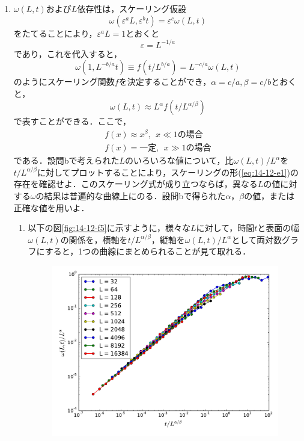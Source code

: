 \documentclass{jsarticle}
\begin{document}
\begin{enumerate}
        \item $\omega(L,t)$および$L$依存性は，スケーリング仮設
        \begin{equation}
            \omega(\varepsilon^{a}L, \varepsilon^{b}t) = \varepsilon^{c}\omega(L,t)
        \end{equation}
        をたてることにより，$\varepsilon^{a}L=1$とおくと
        \begin{equation}
            \varepsilon = L^{-1/a}
        \end{equation}
        であり，これを代入すると，
        \begin{equation}
            \omega(1, L^{-b/a}t) \equiv f(t/L^{b/a}) = L^{-c/a}\omega(L,t)
        \end{equation}
        のようにスケーリング関数$f$を決定することができ，$\alpha=c/a, \beta=c/b$とおくと，
        \begin{equation}
            \omega(L, t) \approx L^{\alpha}f(t/L^{\alpha/\beta})
            \label{eq:14-12-e1}
        \end{equation}
        で表すことができる．ここで，
        \begin{eqnarray}
            f(x) \approx x^{\beta},\ \  x \ll 1 の場合\\
            f(x) = 一定,\ \  x \gg 1 の場合
        \end{eqnarray}
        である．設問bで考えられた$L$のいろいろな値について，比$\omega(L,t)/L^{\alpha}$を$t/L^{\alpha / \beta}$に対してプロットすることにより，スケーリングの形(\ref{eq:14-12-e1})の存在を確認せよ．このスケーリング式が成り立つならば，異なる$L$の値に対する$\omega$の結果は普遍的な曲線上にのる．設問bで得られた$\alpha$，$\beta$の値，または正確な値を用いよ．
            \begin{enumerate}
                \item 以下の図\ref{fig:14-12-f5}に示すように，様々な$L$に対して，時間$t$と表面の幅$\omega(L,t)$の関係を，横軸を$t/L^{\alpha/\beta}$，縦軸を$\omega(L,t)/L^{\alpha}$として両対数グラフにすると，1つの曲線にまとめられることが見て取れる．
                \begin{figure}[H]
                    \begin{center}
                        \includegraphics[width=10.0cm]{figure_5.pdf}

\end{center}
\end{figure}
\end{enumerate}
\end{enumerate}
\end{document}
